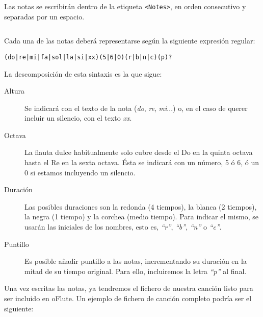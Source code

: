 Las notas se escribirán dentro de la etiqueta \texttt{<Notes>}, en orden
consecutivo y separadas por un espacio.

\inputminted{xml}{apendice_manual_canciones/snippet_4}

Cada una de las notas deberá representarse según la siguiente expresión
regular:
\begin{verbatim}
(do|re|mi|fa|sol|la|si|xx)(5|6|0)(r|b|n|c)(p)?
\end{verbatim}

La descomposición de esta sintaxis es la que sigue:
\begin{description}
\item[Altura] Se indicará con el texto de la nota (\textit{do}, \textit{re},
  \textit{mi}...) o, en el caso de querer incluir un silencio, con el texto
  \textit{xx}.
\item[Octava] La flauta dulce habitualmente solo cubre desde el Do en la quinta
  octava hasta el Re en la sexta octava. Ésta se indicará con un número, 5 ó 6,
  ó un 0 si estamos incluyendo un silencio.
\item[Duración] Las posibles duraciones son la redonda (4 tiempos), la blanca (2
  tiempos), la negra (1 tiempo) y la corchea (medio tiempo). Para indicar el
  mismo, se usarán las iniciales de los nombres, esto es, \textit{``r''},
  \textit{``b''}, \textit{``n''} o \textit{``c''}.
\item[Puntillo] Es posible añadir puntillo a las notas, incrementando su
  duración en la mitad de su tiempo original. Para ello, incluiremos la letra
  \textit{``p''} al final.
\end{description}

Una vez escritas las notas, ya tendremos el fichero de nuestra canción listo
para ser incluido en oFlute. Un ejemplo de fichero de canción completo podría
ser el siguiente:

\inputminted{xml}{apendice_manual_canciones/snippet_5}